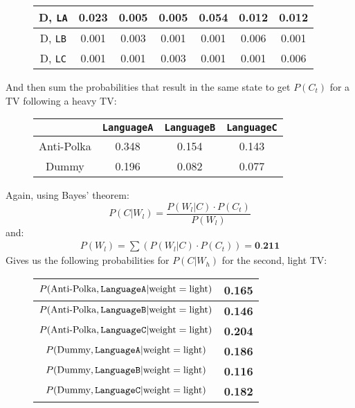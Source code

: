 \documentclass{article}
\begin{document}
\begin{enumerate}[start=0]
\begin{enumerate}
\begin{figure}[H]
\begin{tabular}{|c||c|c|c|c|c|c|}
            D, \texttt{LA}&
            0.023 & 0.005 & 0.005 & 0.054 & 0.012 & 0.012 \\\hline
            D, \texttt{LB}&
            0.001 & 0.003 & 0.001 & 0.001 & 0.006 & 0.001 \\\hline
            D, \texttt{LC}&
            0.001 & 0.001 & 0.003 & 0.001 & 0.001 & 0.006 \\\hline
    \end{tabular}
    \end{figure}
    And then sum the probabilities that result in the same state to get $P(C_t)$
    for a TV following a heavy TV:
    \begin{figure}[H]
    \centering
    \begin{tabular}{|c||c|c|c|}
        \hline
        & \texttt{LanguageA} & \texttt{LanguageB} & \texttt{LanguageC}
        \\\hline\hline
        Anti-Polka & 0.348 & 0.154 & 0.143 \\\hline
        Dummy & 0.196 & 0.082 & 0.077 \\\hline
    \end{tabular}
    \end{figure}
    Again, using Bayes' theorem:
    $$ P(C|W_l) = \frac{P(W_l|C) \cdot P(C_t)}{P(W_l)} $$
    and:
    \begin{align*}
        P(W_l) = \sum{\left( P(W_l|C)\cdot P(C_t)\right)} = \textbf{0.211}
    \end{align*}
    Gives us the following probabilities for $P(C|W_h)$ for the second, light TV:
    \begin{figure}[H]
    \centering
    \begin{tabular}{|c||c|}
        \hline
        $P(\text{Anti-Polka},\text{\texttt{LanguageA}}|\text{weight}=\text{light})$
        & \textbf{0.165} \\\hline
        $P(\text{Anti-Polka},\text{\texttt{LanguageB}}|\text{weight}=\text{light})$
        & \textbf{0.146}\\\hline
        $P(\text{Anti-Polka},\text{\texttt{LanguageC}}|\text{weight}=\text{light})$
        & \textbf{0.204}\\\hline
        $P(\text{Dummy},\text{\texttt{LanguageA}}|\text{weight}=\text{light})$ &
        \textbf{0.186}\\\hline
        $P(\text{Dummy},\text{\texttt{LanguageB}}|\text{weight}=\text{light})$ &
        \textbf{0.116}\\\hline
        $P(\text{Dummy},\text{\texttt{LanguageC}}|\text{weight}=\text{light})$ &
        \textbf{0.182}\\\hline
    \end{tabular}
    \end{figure}


\end{enumerate}
\end{enumerate}
\end{document}
